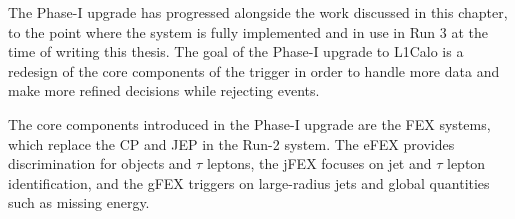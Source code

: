 
The Phase-I upgrade has progressed alongside the work discussed in this chapter,
to the point where the system is fully implemented and in use in Run 3 at the
time of writing this thesis. The goal of the Phase-I upgrade to \ac{L1Calo} is
a redesign of the core components of the trigger in order to handle more data
and make more refined decisions while rejecting events.

The core components introduced in the Phase-I upgrade are the \ac{FEX} systems,
which replace the \ac{CP} and \ac{JEP} in the Run-2 system. The \ac{eFEX}
provides discrimination for \egamma objects and $\tau$ leptons, the \ac{jFEX}
focuses on jet and $\tau$ lepton identification, and the \ac{gFEX} triggers on
large-radius jets and global quantities such as missing energy.

